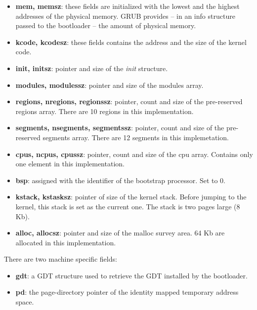 \begin{itemize}

  \item \textbf{mem, memsz}: these fields are initialized with the
  lowest and the highest addresses of the physical memory. GRUB
  provides -- in an info structure passed to the bootloader -- the
  amount of physical memory.

  \item \textbf{kcode, kcodesz}: these fields contains the address and
  the size of the kernel code.

  \item \textbf{init, initsz}: pointer and size of the \textit{init}
  structure.

  \item \textbf{modules, modulessz}: pointer and size of the modules
  array.

  \item \textbf{regions, nregions, regionssz}: pointer, count and size
  of the pre-reserved regions array. There are 10 regions in this
  implementation.

  \item \textbf{segments, nsegments, segmentssz}: pointer, count and
  size of the pre-reserved segments array. There are 12 segments in
  this implemetation.

  \item \textbf{cpus, ncpus, cpussz}: pointer, count and size of the cpu
  array. Contains only one element in this implementation.

  \item \textbf{bsp}: assigned with the identifier of the bootstrap
  processor. Set to 0.

  \item \textbf{kstack, kstasksz}: pointer of size of the kernel
  stack. Before jumping to the kernel, this stack is set as the
  current one. The stack is two pages large (8 Kb).

  \item \textbf{alloc, allocsz}: pointer and size of the malloc survey
  area. 64 Kb are allocated in this implementation.

\end{itemize}

There are two machine specific fields:

\begin{itemize}

  \item \textbf{gdt}: a GDT structure used to retrieve the GDT
  installed by the bootloader.

  \item \textbf{pd}: the page-directory pointer of the identity mapped
  temporary address space.

\end{itemize}

